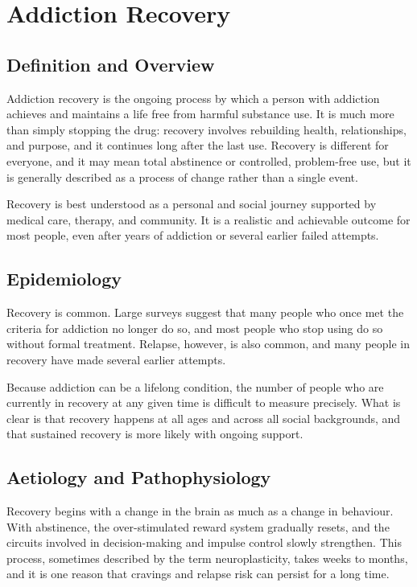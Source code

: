 \chapter{Addiction Recovery}

\section*{Definition and Overview}
Addiction recovery is the ongoing process by which a person with addiction achieves and maintains a life free from harmful substance use. It is much more than simply stopping the drug: recovery involves rebuilding health, relationships, and purpose, and it continues long after the last use. Recovery is different for everyone, and it may mean total abstinence or controlled, problem-free use, but it is generally described as a process of change rather than a single event.

Recovery is best understood as a personal and social journey supported by medical care, therapy, and community. It is a realistic and achievable outcome for most people, even after years of addiction or several earlier failed attempts.

\section*{Epidemiology}
Recovery is common. Large surveys suggest that many people who once met the criteria for addiction no longer do so, and most people who stop using do so without formal treatment. Relapse, however, is also common, and many people in recovery have made several earlier attempts.

Because addiction can be a lifelong condition, the number of people who are currently in recovery at any given time is difficult to measure precisely. What is clear is that recovery happens at all ages and across all social backgrounds, and that sustained recovery is more likely with ongoing support.

\section*{Aetiology and Pathophysiology}
Recovery begins with a change in the brain as much as a change in behaviour. With abstinence, the over-stimulated reward system gradually resets, and the circuits involved in decision-making and impulse control slowly strengthen. This process, sometimes described by the term neuroplasticity, takes weeks to months, and it is one reason that cravings and relapse risk can persist for a long time.

